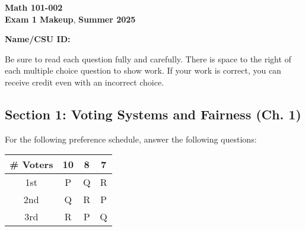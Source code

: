 \documentclass[12pt]{exam}
\newcommand{\class}{Math 101-002}
\newcommand{\examnum}{Exam 1 Makeup}
\newcommand{\examdate}{Summer 2025}
\begin{document}
\pagestyle{plain}
\thispagestyle{empty}

\noindent
\textbf{\class}\\
\textbf{\examnum}, \textbf{\examdate} \\

\vspace{10pt}

\textbf{Name/CSU ID:}

\vspace{10pt}

Be sure to read each question fully and carefully. There is space to the right of each multiple choice question to show work. If your work is correct, you can receive credit even with an incorrect choice.
\begin{questions}

\section*{Section 1: Voting Systems and Fairness (Ch. 1)}

\question[10] For the following preference schedule, answer the following questions:

\begin{center}
\begin{tabular}{cccc}
\toprule
\# Voters & 10 & 8 & 7 \\
\midrule
1st & P & Q & R \\
2nd & Q & R & P \\
3rd & R & P & Q \\
\bottomrule
\end{tabular}
\end{center}

\end{questions}
\end{document}
